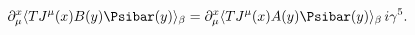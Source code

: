 \begin{equation}
  \partial^x_\mu\langle T J^\mu(x)B(y)\Psibar(y)\rangle_\beta
  =\partial^x_\mu\langle T 
     J^\mu(x)A(y)\Psibar(y)\rangle_\beta\, i\gamma^5.
\end{equation}

